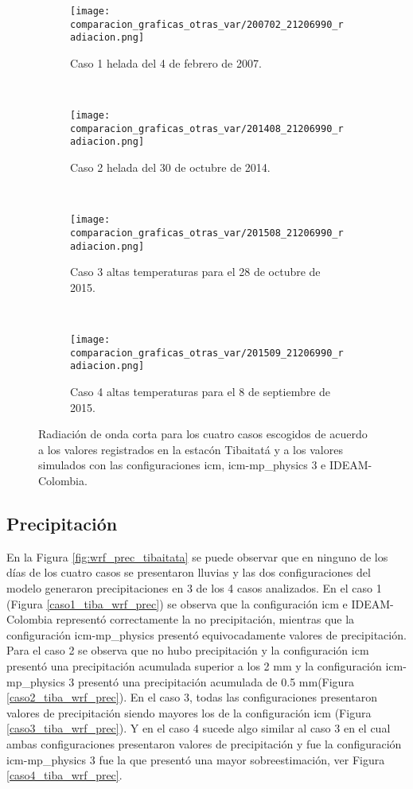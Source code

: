 \begin{figure}[H]
    
\begin{subfigure}[normla]{0.4\textwidth}
\caption{Caso 1 helada del 4 de febrero de 2007.}
\label{caso1_tiba_wrf_rad}
\texttt{[image: comparacion\_graficas\_otras\_var/200702\_21206990\_radiacion.png]}
\end{subfigure}
~
\begin{subfigure}[normla]{0.4\textwidth}
\caption{Caso 2 helada del 30 de octubre de 2014.}
\label{caso2_tiba_wrf_rad}
\texttt{[image: comparacion\_graficas\_otras\_var/201408\_21206990\_radiacion.png]}
\end{subfigure}
~
\centering
\begin{subfigure}[normla]{0.4\textwidth}
\caption{Caso 3 altas temperaturas para el 28 de octubre de 2015.}
\label{caso3_tiba_wrf_rad}
\texttt{[image: comparacion\_graficas\_otras\_var/201508\_21206990\_radiacion.png]}
\end{subfigure}
~
\centering
\begin{subfigure}[normla]{0.4\textwidth}
\caption{Caso 4 altas temperaturas para el 8 de septiembre de 2015.}
\label{caso4_tiba_wrf_rad}
\texttt{[image: comparacion\_graficas\_otras\_var/201509\_21206990\_radiacion.png]}
\end{subfigure}

    \caption{Radiación de onda corta para los cuatro casos escogidos de acuerdo a los valores registrados en la estacón Tibaitatá y a los valores simulados con las configuraciones icm, icm-mp\_physics 3 e IDEAM-Colombia.} %
    \label{fig:wrf_rad_tibaitata}
\end{figure}


\subsection{Precipitación}

En la Figura \ref{fig:wrf_prec_tibaitata} se puede observar que en ninguno de los días de los cuatro casos se presentaron lluvias y las dos configuraciones del modelo generaron precipitaciones en 3 de los 4 casos analizados. En el caso 1 (Figura \ref{caso1_tiba_wrf_prec}) se observa que la configuración icm e IDEAM-Colombia representó correctamente la no precipitación, mientras que la configuración icm-mp\_physics presentó equivocadamente valores de precipitación. Para el caso 2 se observa que no hubo precipitación y la configuración icm presentó una precipitación acumulada superior a los 2 mm y la configuración icm-mp\_physics 3 presentó una precipitación acumulada de 0.5 mm(Figura \ref{caso2_tiba_wrf_prec}). En el caso 3, todas las configuraciones presentaron valores de precipitación siendo mayores los de la configuración icm (Figura \ref{caso3_tiba_wrf_prec}). Y en el caso 4 sucede algo similar al caso 3 en el cual ambas configuraciones presentaron valores de precipitación y fue la configuración icm-mp_physics 3 fue la que presentó una mayor sobreestimación, ver Figura \ref{caso4_tiba_wrf_prec}.\\

